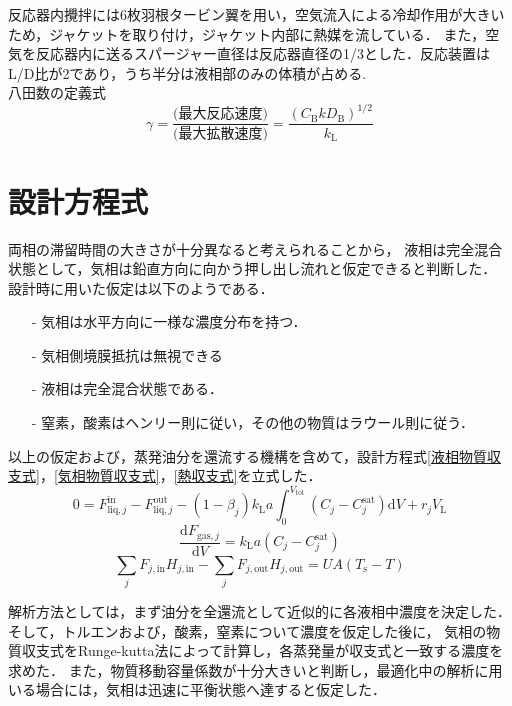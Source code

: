 \documentclass[a4j]{jsreport}
\newcommand{\diff}{\mathrm{d}}
\begin{document}
反応器内攪拌には6枚羽根タービン翼を用い，空気流入による冷却作用が大きいため，ジャケットを取り付け，ジャケット内部に熱媒を流している．
また，空気を反応器内に送るスパージャー直径は反応器直径の1/3とした．反応装置はL/D比が2であり，うち半分は液相部のみの体積が占める.\\

八田数の定義式
\begin{equation}
    \gamma = \frac{\text{(最大反応速度)}}{\text{(最大拡散速度)}} = \frac{(C_\mathrm{B} k D_\mathrm{B})^{1/2}}{k_\mathrm{L}}
\end{equation}

\section{設計方程式}
両相の滞留時間の大きさが十分異なると考えられることから，
液相は完全混合状態として，気相は鉛直方向に向かう押し出し流れと仮定できると判断した．
設計時に用いた仮定は以下のようである．
\begin{itemize}
    \item[-] 気相は水平方向に一様な濃度分布を持つ．
    \item[-] 気相側境膜抵抗は無視できる
    \item[-] 液相は完全混合状態である．
    \item[-] 窒素，酸素はヘンリー則に従い，その他の物質はラウール則に従う．
\end{itemize}
以上の仮定および，蒸発油分を還流する機構を含めて，設計方程式\eqref{液相物質収支式}，\eqref{気相物質収支式}，\eqref{熱収支式}を立式した．
\begin{equation}
    \label{液相物質収支式}
    0 = F^\text{in}_{\text{liq},j} - F^\text{out}_{\text{liq},j} - (1 - \beta_j) k_\mathrm{L} a \int^{V_\text{tot}}_0(C_j - C^\text{sat}_j) \diff V + r_j V_\mathrm{L}
\end{equation}
\begin{equation}
    \label{気相物質収支式}
    \frac{\diff F_{\text{gas},j}}{\diff V} = k_\mathrm{L} a (C_j - C^\text{sat}_j)
\end{equation}
\begin{equation}
    \label{熱収支式}
    \sum_jF_{j,\mathrm{in}}H_{j,\mathrm{in}}-\sum_jF_{j,\text{out}}H_{j,\text{out}} = UA(T_\mathrm{s}-T)
\end{equation}

解析方法としては，まず油分を全還流として近似的に各液相中濃度を決定した．そして，トルエンおよび，酸素，窒素について濃度を仮定した後に，
気相の物質収支式をRunge-kutta法によって計算し，各蒸発量が収支式と一致する濃度を求めた．
また，物質移動容量係数が十分大きいと判断し，最適化中の解析に用いる場合には，気相は迅速に平衡状態へ達すると仮定した．
\end{document}
